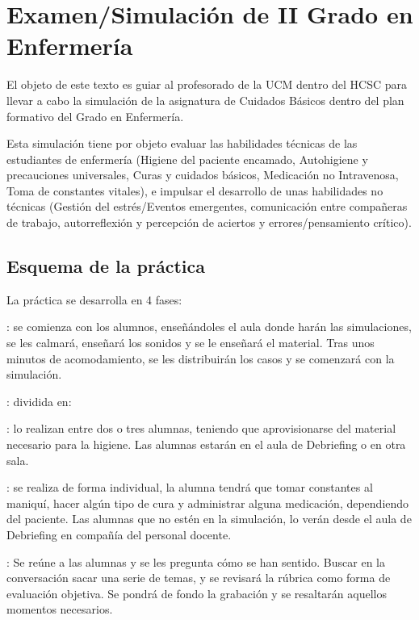 \section{Examen/Simulación de II Grado en Enfermería}
El objeto de este texto es guiar al profesorado de la UCM dentro del HCSC para llevar a cabo la simulación de la asignatura de Cuidados Básicos dentro del plan formativo del Grado en Enfermería.

Esta simulación tiene por objeto evaluar las habilidades técnicas de las estudiantes de enfermería (Higiene del paciente encamado, Autohigiene y precauciones universales, Curas y cuidados básicos, Medicación no Intravenosa, Toma de constantes vitales), e impulsar el desarrollo de unas habilidades no técnicas (Gestión del estrés/Eventos emergentes, comunicación entre compañeras de trabajo, autorreflexión y percepción de aciertos y errores/pensamiento crítico).

\subsection{Esquema de la práctica}
La práctica se desarrolla en 4 fases:
\begin{description}[topsep=0pt, partopsep=0pt,itemsep=0pt,parsep=0pt]
    \item [Prebriefing]: se comienza con los alumnos, enseñándoles el aula donde harán las simulaciones, se les calmará, enseñará los sonidos y se le enseñará el material. Tras unos minutos de acomodamiento, se les distribuirán los casos y se comenzará con la simulación.
    \item [Simulación]: dividida en:
    \begin{description}[topsep=0pt, partopsep=0pt,itemsep=0pt,parsep=0pt]
        \item [Simulación del paciente encamado]: lo realizan entre dos o tres alumnas, teniendo que aprovisionarse del material necesario para la higiene. Las alumnas estarán en el aula de Debriefing o en otra sala.
        \item [Simulación de cuidados del paciente]: se realiza de forma individual, la alumna tendrá que tomar constantes al maniquí, hacer algún tipo de cura y administrar alguna medicación, dependiendo del paciente. Las alumnas que no estén en la simulación, lo verán desde el aula de Debriefing en compañía del personal docente.
    \end{description}
    \item [Debriefing]: Se reúne a las alumnas y se les pregunta cómo se han sentido. Buscar en la conversación sacar una serie de temas, y se revisará la rúbrica como forma de evaluación objetiva. Se pondrá de fondo la grabación y se resaltarán aquellos momentos necesarios.
\end{description}
